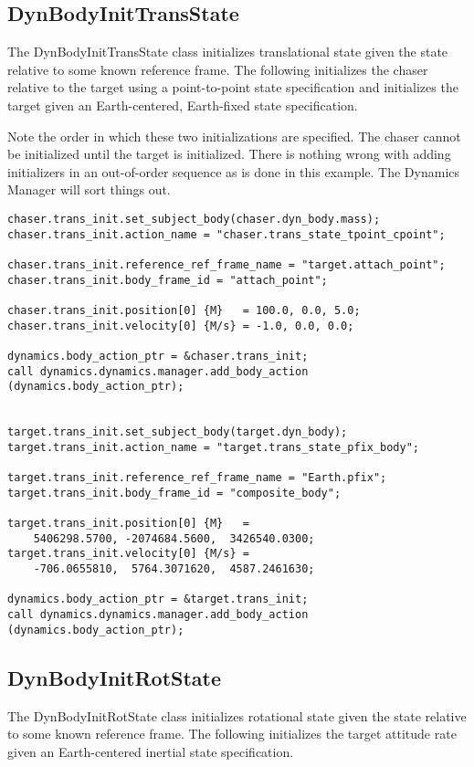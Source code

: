 \subsection{DynBodyInitTransState}
The DynBodyInitTransState class initializes translational state
given the state relative to some known reference frame.
The following initializes the chaser relative to the target
using a point-to-point state specification
and initializes the target given an Earth-centered, Earth-fixed
state specification.

Note the order in which these two initializations are specified.
The chaser cannot be initialized until the target is initialized.
There is nothing wrong with adding initializers in an out-of-order
sequence as is done in this example. The Dynamics Manager will
sort things out.

\begin{verbatim}
chaser.trans_init.set_subject_body(chaser.dyn_body.mass);
chaser.trans_init.action_name = "chaser.trans_state_tpoint_cpoint";

chaser.trans_init.reference_ref_frame_name = "target.attach_point";
chaser.trans_init.body_frame_id = "attach_point";

chaser.trans_init.position[0] {M}   = 100.0, 0.0, 5.0;
chaser.trans_init.velocity[0] {M/s} = -1.0, 0.0, 0.0;

dynamics.body_action_ptr = &chaser.trans_init;
call dynamics.dynamics.manager.add_body_action (dynamics.body_action_ptr);


target.trans_init.set_subject_body(target.dyn_body);
target.trans_init.action_name = "target.trans_state_pfix_body";

target.trans_init.reference_ref_frame_name = "Earth.pfix";
target.trans_init.body_frame_id = "composite_body";

target.trans_init.position[0] {M}   =
    5406298.5700, -2074684.5600,  3426540.0300;
target.trans_init.velocity[0] {M/s} =
    -706.0655810,  5764.3071620,  4587.2461630;

dynamics.body_action_ptr = &target.trans_init;
call dynamics.dynamics.manager.add_body_action (dynamics.body_action_ptr);
\end{verbatim}

\subsection{DynBodyInitRotState}
The DynBodyInitRotState class initializes rotational state
given the state relative to some known reference frame.
The following initializes the target attitude rate
given an Earth-centered inertial state specification.

